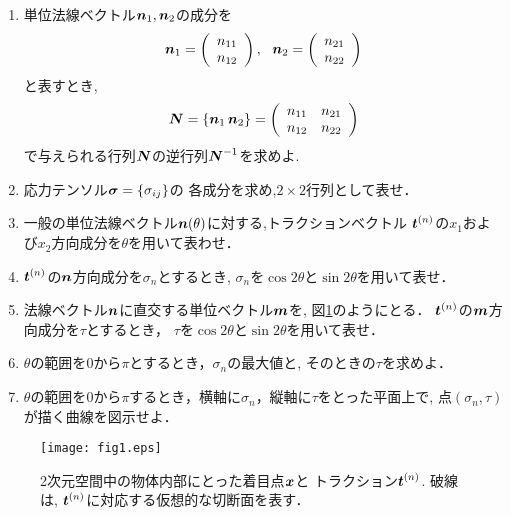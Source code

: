 \documentclass[10pt,a4j]{jarticle}
\begin{document}
\begin{enumerate}
\item
	単位法線ベクトル$\mbox{\boldmath $n$}_1, \mbox{\boldmath $n$}_2$の成分を
	\[
	\fat{n}_1=
	\left(
		\begin{array}{c}
			n_{11} \\
			n_{12}
		\end{array}
	\right), \ \ 
	\fat{n}_2=
	\left(
		\begin{array}{c}
			n_{21}\\
			n_{22}
		\end{array}
	\right)
	\]
	と表すとき,
	\[
		\mbox{\boldmath $N$}=\left\{ \mbox{\boldmath $n$}_1 \, \mbox{\boldmath $n$}_2 \right\} =
		\left(
		\begin{array}{cc}
			n_{11} & n_{21}  \\
			n_{12} & n_{22} 
		\end{array}
		\right)
	\]
	で与えられる行列$\mbox{\boldmath $N$}$の逆行列$\mbox{\boldmath $N$}^{-1}$を求めよ.
\item
	応力テンソル$\mbox{\boldmath $\sigma$}=\left\{\sigma_{ij}\right\}$の
	各成分を求め,$2\times 2$行列として表せ．
\item
	一般の単位法線ベクトル$\mbox{\boldmath $n$}(\theta)$に対する,トラクションベクトル
	$\mbox{\boldmath $t$}^{(n)}$の$x_1$および$x_2$方向成分を$\theta$を用いて表わせ．
\item
	$\mbox{\boldmath $t$}^{(n)}$の$\mbox{\boldmath $n$}$方向成分を$\sigma_n$とするとき,
	$\sigma_n$を$\cos 2\theta$と$\sin 2\theta$を用いて表せ．
\item
	法線ベクトル$\mbox{\boldmath $n$}$に直交する単位ベクトル$\mbox{\boldmath $m$}$を, 
	図\ref{fig:fig1}のようにとる．
	$\mbox{\boldmath $t$}^{(n)}$の$\mbox{\boldmath $m$}$方向成分を$\tau$とするとき，
	$\tau$を$\cos 2\theta$と$\sin 2\theta$を用いて表せ．
\item
	$\theta$の範囲を$0$から$\pi$とするとき，$\sigma_n$の最大値と, 
	そのときの$\tau$を求めよ．
\item
	$\theta$の範囲を$0$から$\pi$するとき，横軸に$\sigma_n$，縦軸に$\tau$をとった平面上で, 点$(\sigma_n, \tau)$が描く曲線を図示せよ．
\end{enumerate}
\begin{figure}[h]
	\begin{center}
	\texttt{[image: fig1.eps]} 
	\end{center}
	\caption{
		2次元空間中の物体内部にとった着目点$\mbox{\boldmath $x$}$と
		トラクション$\mbox{\boldmath $t$}^{(n)}$.
		破線は, $\mbox{\boldmath $t$}^{(n)}$に対応する仮想的な切断面を表す．	
	} 
	\label{fig:fig1}
\end{figure}
\end{document}
